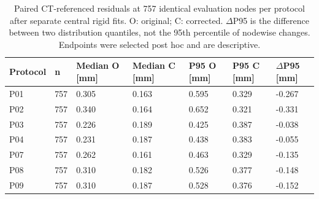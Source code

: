 \begin{table}
\caption{Paired CT-referenced residuals at 757 identical evaluation nodes per protocol after separate central rigid fits. O: original; C: corrected. $\Delta$P95 is the difference between two distribution quantiles, not the 95th percentile of nodewise changes. Endpoints were selected post hoc and are descriptive.}
\centering
\begin{tabular}{lllllll}
\hline
Protocol & n & Median O [mm] & Median C [mm] & P95 O [mm] & P95 C [mm] & $\Delta$P95 [mm] \\
\hline
P01 & 757 & 0.305 & 0.163 & 0.595 & 0.329 & -0.267 \\
P02 & 757 & 0.340 & 0.164 & 0.652 & 0.321 & -0.331 \\
P03 & 757 & 0.226 & 0.189 & 0.425 & 0.387 & -0.038 \\
P04 & 757 & 0.231 & 0.187 & 0.438 & 0.383 & -0.055 \\
P07 & 757 & 0.262 & 0.161 & 0.463 & 0.329 & -0.135 \\
P08 & 757 & 0.310 & 0.182 & 0.526 & 0.377 & -0.148 \\
P09 & 757 & 0.310 & 0.187 & 0.528 & 0.376 & -0.152 \\
\hline
\end{tabular}
\end{table}
